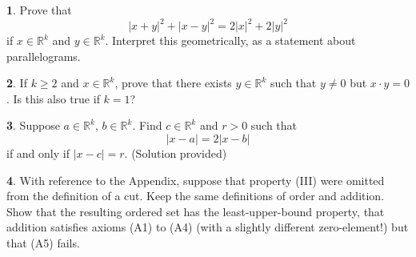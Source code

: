 \documentclass[12pt]{article}
\theoremstyle{definition}
\newtheorem{ex}{}
\begin{document}
\begin{ex}
	Prove that \begin{equation*}
		|x + y|^2 + |x - y|^2 = 2|x|^2 + 2|y|^2
	\end{equation*}
	if $x \in \mathbb{R}^k$ and $y \in \mathbb{R}^k$.
	Interpret this geometrically, as a statement about parallelograms.
\end{ex}

\begin{ex}
	If $k \geq 2$ and $x \in \mathbb{R}^k$, prove that there exists $y \in \mathbb{R}^k$ such that $y \neq 0$ but $x \cdot y = 0$.
	Is this also true if $k = 1$?
\end{ex}

\begin{ex}
	Suppose $a \in \mathbb{R}^k$, $b \in \mathbb{R}^k$.
	Find $c \in \mathbb{R}^k$ and $r > 0$ such that \begin{equation*}
		|x - a| = 2|x - b|
	\end{equation*}
	if and only if $|x - c| = r$.
	(Solution provided)
\end{ex}

\begin{ex}
	With reference to the Appendix, suppose that property (III) were omitted from the definition of a cut.
	Keep the same definitions of order and addition.
	Show that the resulting ordered set has the least-upper-bound property, that addition satisfies axioms (A1) to (A4) (with a slightly different zero-element!) but that (A5) fails.
\end{ex}
\end{document}
